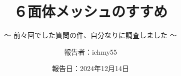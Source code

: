 %
\title{６面体メッシュのすすめ}
\subtitle{～ 前々回でした質問の件、自分なりに調査しました ～}
%
%
%
\date[Dec.14th,2024]{報告日：2024年12月14日}
\author[ichmy55]{報告者：ichmy55}
\subject{Recommendation for hexahedral mesh}
